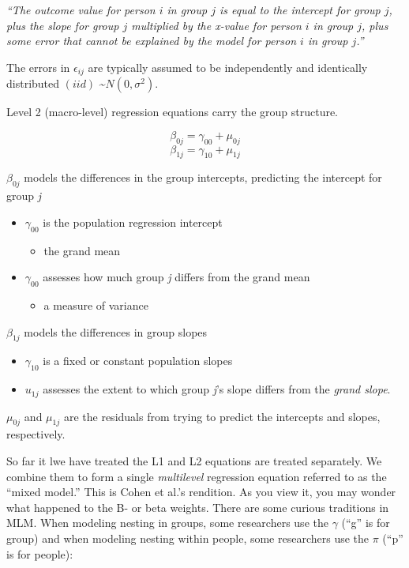 \documentclass[
  11pt,
]{book}
\providecommand{\tightlist}{%
  \setlength{\itemsep}{0pt}\setlength{\parskip}{0pt}}
\begin{document}
\emph{``The outcome value for person \(i\) in group \(j\) is equal to the intercept for group \(j\), plus the slope for group \(j\) multiplied by the x-value for person \(i\) in group \(j\), plus some error that cannot be explained by the model for person \(i\) in group \(j\).''}

The errors in \(\epsilon_{ij}\) are typically assumed to be independently and identically distributed \((iid)\) \textasciitilde{}\(N(0, \sigma^2)\).

Level 2 (macro-level) regression equations carry the group structure.

\[\beta _{0j}=\gamma _{00}+\mu _{0j}\]
\[\beta _{1j}=\gamma _{10}+\mu_{1j}\]

\(\beta _{0j}\) models the differences in the group intercepts, predicting the intercept for group \emph{j}

\begin{itemize}
\tightlist
\item
  \(\gamma _{00}\) is the population regression intercept

  \begin{itemize}
  \tightlist
  \item
    the grand mean
  \end{itemize}
\item
  \(\gamma _{00}\) assesses how much group \emph{j} differs from the grand mean

  \begin{itemize}
  \tightlist
  \item
    a measure of variance
  \end{itemize}
\end{itemize}

\(\beta _{1j}\) models the differences in group slopes

\begin{itemize}
\tightlist
\item
  \(\gamma _{10}\) is a fixed or constant population slopes
\item
  \(u_{1j}\) assesses the extent to which group \emph{j}'s slope differs from the \emph{grand slope}.
\end{itemize}

\(\mu _{0j}\) and \(\mu_{1j}\) are the residuals from trying to predict the intercepts and slopes, respectively.

So far it lwe have treated the L1 and L2 equations are treated separately. We combine them to form a single \emph{multilevel} regression equation referred to as the ``mixed model.'' This is Cohen et al.'s \citeyearpar{cohen_applied_2003} rendition. As you view it, you may wonder what happened to the B- or beta weights. There are some curious traditions in MLM. When modeling nesting in groups, some researchers use the \(\gamma\) (``g'' is for group) and when modeling nesting within people, some researchers use the \(\pi\) (``p'' is for people):
\end{document}
